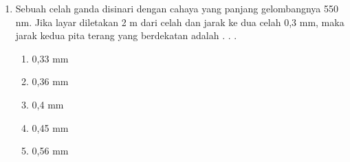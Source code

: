 \documentclass[10pt,a4paper]{extarticle}
\newcommand{\pilgani}[1]{                            \vspace{-0.3cm}\begin{multicols}{2}
 \begin{enumerate}[label=\Alph*., itemsep=0pt,topsep=0pt,leftmargin=*,align=Center]#1                     \end{enumerate}
 \phantom{ini cuma sapi, wedus, dan ayam}
 \end{multicols}}
\begin{document}
\begin{multicols*}{2}
\begin{enumerate}
\item Sebuah celah ganda disinari dengan cahaya yang panjang gelombangnya 550 nm. Jika layar diletakan 2 m dari celah dan jarak ke dua celah 0,3 mm, maka jarak kedua pita terang yang berdekatan adalah . . .
\pilgani{
        \item 0,33 mm
        \item 0,36 mm
        \item 0,4 mm
        \item 0,45 mm
        \item 0,56 mm
        }

\vspace{2cm}


\end{enumerate}

\end{multicols*}
\end{document}
